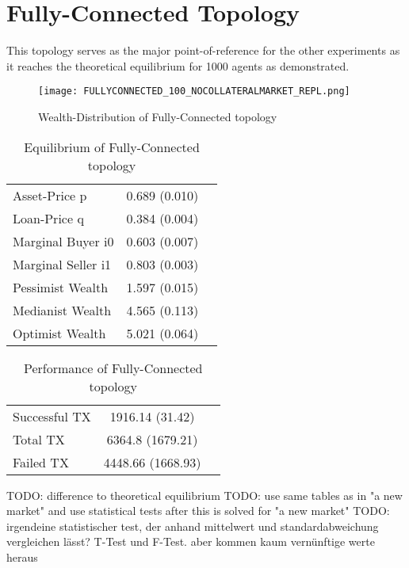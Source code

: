 \documentclass[Bachelorarbeit.tex]{subfiles}
\begin{document}
\section{Fully-Connected Topology}
This topology serves as the major point-of-reference for the other experiments as it reaches the theoretical equilibrium for 1000 agents as demonstrated.

\begin{figure}[H]
	\centering
  \texttt{[image: FULLYCONNECTED\_100\_NOCOLLATERALMARKET\_REPL.png]}
	\caption{Wealth-Distribution of Fully-Connected topology}
	\label{fig:wealth_FULLYCONNECTED_100_NOCOLLATERALMARKET_REPL}
\end{figure}

\begin{table}[H]
	\caption{Equilibrium of Fully-Connected topology}
	\centering
	\begin{tabular} { l c r }
		\hline
		Asset-Price p & 0.689 (0.010) \\
		Loan-Price q & 0.384 (0.004) \\
		Marginal Buyer i0 & 0.603 (0.007) \\
		Marginal Seller i1 & 0.803 (0.003) \\
		\hline
		Pessimist Wealth & 1.597 (0.015) \\
		Medianist Wealth & 4.565 (0.113) \\
		Optimist Wealth & 5.021 (0.064) \\
		\hline
	\end{tabular}
	\label{tab:fullyconnected_equilibrium_100Agents_05Bond}
\end{table} 

\begin{table}[H]
	\caption{Performance of Fully-Connected topology}
	\centering
	\begin{tabular} { l c r }
		\hline
		Successful TX & 1916.14 (31.42) \\
		Total TX & 6364.8 (1679.21) \\
		Failed TX & 4448.66 (1668.93) \\
		\hline
	\end{tabular}
\end{table}

TODO: difference to theoretical equilibrium
TODO: use same tables as in "a new market" and use statistical tests after this is solved for "a new market"
TODO: irgendeine statistischer test, der anhand mittelwert und standardabweichung vergleichen lässt?
T-Test und F-Test.
aber kommen kaum vernünftige werte heraus
\end{document}
